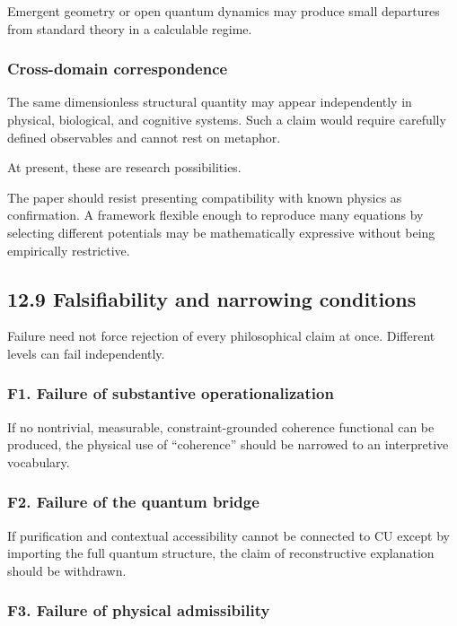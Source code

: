 \documentclass[
  11pt,
]{article}
\begin{document}
Emergent geometry or open quantum dynamics may produce small departures
from standard theory in a calculable regime.

\subsubsection{Cross-domain
correspondence}\label{cross-domain-correspondence}

The same dimensionless structural quantity may appear independently in
physical, biological, and cognitive systems. Such a claim would require
carefully defined observables and cannot rest on metaphor.

At present, these are research possibilities.

The paper should resist presenting compatibility with known physics as
confirmation. A framework flexible enough to reproduce many equations by
selecting different potentials may be mathematically expressive without
being empirically restrictive.

\subsection{12.9 Falsifiability and narrowing
conditions}\label{falsifiability-and-narrowing-conditions}

Failure need not force rejection of every philosophical claim at once.
Different levels can fail independently.

\subsubsection{F1. Failure of substantive
operationalization}\label{f1.-failure-of-substantive-operationalization}

If no nontrivial, measurable, constraint-grounded coherence functional
can be produced, the physical use of ``coherence'' should be narrowed to
an interpretive vocabulary.

\subsubsection{F2. Failure of the quantum
bridge}\label{f2.-failure-of-the-quantum-bridge}

If purification and contextual accessibility cannot be connected to CU
except by importing the full quantum structure, the claim of
reconstructive explanation should be withdrawn.

\subsubsection{F3. Failure of physical
admissibility}\label{f3.-failure-of-physical-admissibility}
\end{document}

